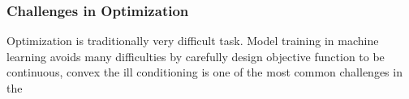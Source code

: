 \subsubsection{Challenges in Optimization}

Optimization is traditionally very difficult task. Model training in machine learning avoids many difficulties by carefully design objective function to be continuous, convex 
the ill conditioning is one of the most common challenges in the 